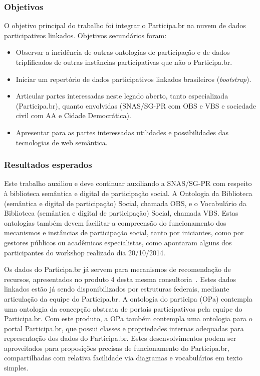 \documentclass[12pt]{article}
\begin{document}
\subsubsection{Objetivos}
O objetivo principal do trabalho foi integrar o Participa.br na nuvem de dados participativos linkados. Objetivos secundários foram:
\begin{itemize}
    \item Observar a incidência de outras ontologias de participação e de dados triplificados de outras instâncias participativas que não o Participa.br.
    \item Iniciar um repertório de dados participativos linkados brasileiros (\emph{bootstrap}).
    \item Articular partes interessadas neste legado aberto, tanto especializada (Participa.br), quanto envolvidas (SNAS/SG-PR com OBS e VBS e sociedade civil com AA e Cidade Democrática).
    \item Apresentar para as partes interessadas utilidades e possibilidades das tecnologias de web semântica.
\end{itemize}

\subsubsection{Resultados esperados}\label{subsec:resp}
Este trabalho auxiliou e deve continuar auxiliando a SNAS/SG-PR com respeito à biblioteca semântica e digital de participação social. A Ontologia da Biblioteca (semântica e digital de participação) Social, chamada OBS, e o Vocabulário da Biblioteca (semântica e digital de participação) Social, chamada VBS. Estas ontologias também devem facilitar a compreensão do funcionamento dos mecanismos e instâncias de participação social, tanto por iniciantes, como por gestores públicos ou acadêmicos especialistas, como apontaram alguns dos participantes do workshop realizado dia 20/10/2014.

Os dados do Participa.br já servem para mecanismos de recomendação de recursos, apresentados no produto 4 desta mesma consultoria~\cite{repoProd4}. Estes dados linkados estão já sendo disponibilizados por estruturas federais, mediante articulação da equipe do Participa.br. A ontologia do participa (OPa) contempla uma ontologia da concepção abstrata de portais participativos pela equipe do Participa.br. Com este produto, a OPa também contempla uma ontologia para o portal Participa.br, que possui classes e propriedades internas adequadas para representação dos dados do Participa.br. Estes desenvolvimentos podem ser aproveitados para proposições precisas de funcionamento do Participa.br, compartilhadas com relativa facilidade via diagramas e vocabulários em texto simples.
\end{document}
